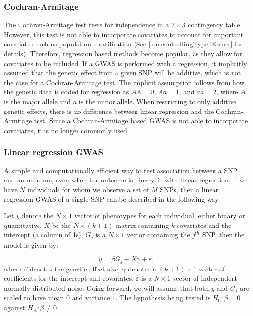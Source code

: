 \subsubsection{Cochran-Armitage}
The Cochran-Armitage test tests for independence in a $ 2\times 3 $ contingency table. However, this test is not able to incorporate covariates to account for important covariates such as population stratification (See \cref{sec:controllingType1Errors} for details). Therefore, regression based methods become popular, as they allow for covariates to be included. If a GWAS is performed with a regression, it implicitly assumed that the genetic effect from a given SNP will be additive, which is not the case for a Cochran-Armitage test. The implicit assumption follows from how the genetic data is coded for regression as $ AA = 0 $, $ Aa = 1 $, and $ aa = 2 $, where $ A $ is the major allele and $ a $ is the minor allele\cite{zeng2015statistical}. When restricting to only additive genetic effects, there is no difference between linear regression and the Cochran-Armitage test\cite{prive2019making}. Since a Cochran-Armitage based GWAS is not able to incorporate covariates, it is no longer commonly used.

\subsubsection{Linear regression GWAS}
A simple and computationally efficient way to test association between a SNP and an outcome, even when the outcome is binary, is with linear regression. If we have $ N $ individuals for whom we observe a set of $ M $ SNPs, then a linear regression GWAS of a single SNP can be described in the following way.

Let $ y $ denote the $ N\times1 $ vector of phenotypes for each individual, either binary or quantitative, $ X $ be the $ N \times (k+1) $ matrix containing $ k $ covariates and the intercept (a column of 1s), $ G_j $ is a $ N\times 1 $ vector containing the $ j^{th} $ SNP, then the model is given by:

\begin{equation}\label{eq:baseGWAS}
y = \beta G_{j} +  X\gamma + \varepsilon,
\end{equation}
where $ \beta $ denotes the genetic effect size, $ \gamma $ denotes a $ (k + 1) \times 1$ vector of coefficients for the intercept and 
covariates, $ \varepsilon $ is a $ N \times 1 $ vector of independent normally distributed noise. Going forward, we will assume that 
both $ y $ and $ G_j $ are scaled to have mean $ 0 $ and variance $ 1 $. The hypothesis being tested is $ H_0: \beta = 0 $ against $ 
H_A: \beta \neq 0 $. 
 

